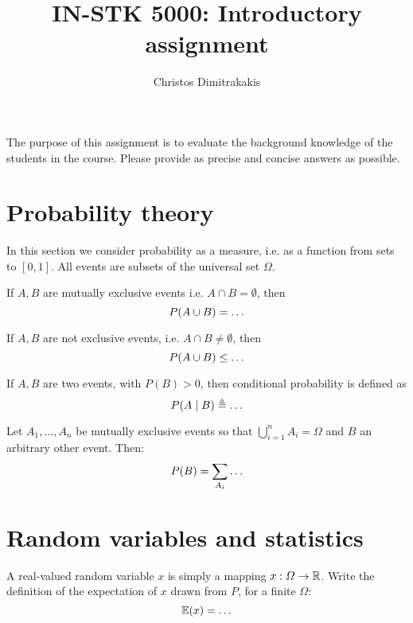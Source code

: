 \documentclass[a4paper]{article}
\title{IN-STK 5000: Introductory assignment}
\author{Christos Dimitrakakis}
\begin{document}
\maketitle
The purpose of this assignment is to evaluate the background knowledge
of the students in the course. Please provide as precise and concise
answers as possible. 

\section{Probability theory}
In this section we consider probability as a measure, i.e. as a function from sets to $[0,1]$. All events are subsets of the universal set $\Omega$.
\begin{exercise}
  If $A, B$ are mutually exclusive events i.e. $A \cap B = \emptyset$,  then 
  \[
  P(A \cup B) =
  \ifdefined \solution
  P(A) + P(B)
  \else
  \ldots
  \fi
  \]
\end{exercise}
\begin{exercise}
  If $A, B$ are not exclusive events, i.e. $A \cap B \neq \emptyset$, then 
  \[
  P(A \cup B) \leq
  \ifdefined \solution
  P(A) + P(B)
  \else
  \ldots
  \fi
  \]
\end{exercise}

\begin{exercise}
  If $A, B$ are two events, with $P(B) > 0$, then conditional probability is defined as
  \[
  P(A \mid B) \defn 
  \ifdefined \solution
  \frac{P(A \cap B)}{P(B)}
  \else
  \ldots
  \fi
  \]
\end{exercise}

\begin{exercise}
  Let $A_1, \ldots, A_n$ be mutually exclusive events so that $\bigcup_{i=1}^n A_i = \Omega$ and $B$ an arbitrary other event. Then:
  \[
  P(B) = \sum_{A_i} 
  \ifdefined \solution
  P(A_i \cap B)
  =
  \sum_{A_i} 
  P(B \mid A_i)
  P(A_i )
  \else
  \ldots
  \fi
  \]
\end{exercise}

\section{Random variables and statistics}


\begin{exercise}
  A real-valued random variable $x$ is simply a mapping $x : \Omega \to {\mathbb{R}}$.
  Write the definition of the expectation of $x$ drawn from $P$, for a finite $\Omega$:
  \[
  \E(x) = 
  \ifdefined \solution
  \sum_{\omega} x(\omega) P(\omega) 
  \else
  \ldots
  \fi
  \]
\end{exercise}
\end{document}
